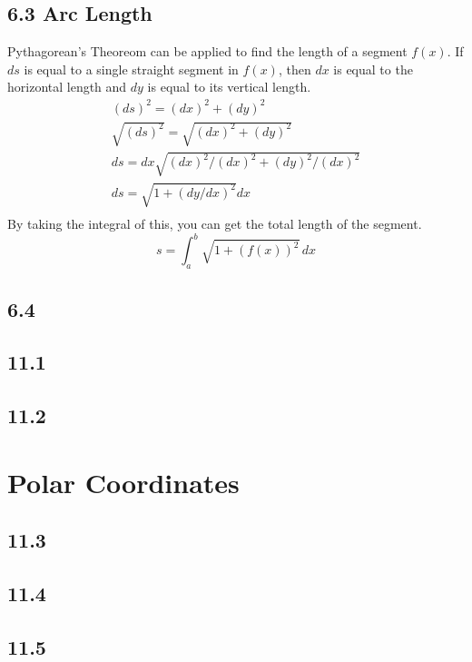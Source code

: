 \documentclass{article}
\begin{document}
        \subsection*{6.3 Arc Length}
            Pythagorean's Theoreom can be applied to find the length of a segment \(f(x)\).
            If \(ds\) is equal to a single straight segment in \(f(x)\), then  \(dx\) is equal to the horizontal length and \(dy\) is equal to its vertical length. 
            \begin{equation}
                \begin{split}
                    (ds)^2 = (dx)^2 + (dy)^2 \\
                    \sqrt{(ds)^2} = \sqrt{(dx)^2 + (dy)^2}\\
                    ds = dx  \sqrt{(dx)^2 / (dx)^2 + (dy)^2 / (dx) ^2}\\
                    ds = \sqrt{1 + (dy/dx)^2}dx\\
                \end{split}
            \end{equation}
            By taking the integral of this, you can get the total length of the segment.
            \begin{equation}
                s = \int_a^b \sqrt{1 + (f(x))^2} \, dx
            \end{equation}
        \color{Black}
        \subsection*{6.4}
        \subsection*{11.1}
        \subsection*{11.2}
    \section{Polar Coordinates}
        \subsection*{11.3}
        \subsection*{11.4}
        \subsection*{11.5}
        \color{Aquamarine}
\end{document}
